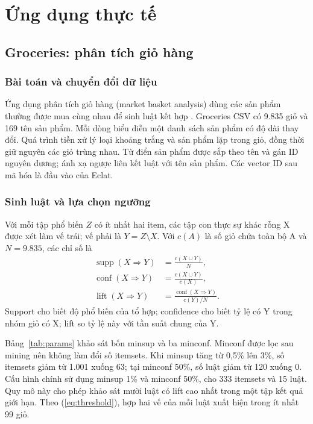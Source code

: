 \section{Ứng dụng thực tế}\label{sec:applications}
\subsection{Groceries: phân tích giỏ hàng}\label{sec:groceries}
\subsubsection{Bài toán và chuyển đổi dữ liệu}
Ứng dụng phân tích giỏ hàng (market basket analysis) dùng các sản phẩm
thường được mua cùng nhau để sinh luật kết hợp \cite{agrawal}.
Groceries CSV \cite{groceries} có 9.835 giỏ và 169 tên sản phẩm.
Mỗi dòng biểu diễn một danh sách sản phẩm có độ dài thay đổi. Quá trình
tiền xử lý loại khoảng trắng và sản phẩm lặp trong giỏ, đồng thời giữ
nguyên các giỏ trùng nhau. Từ điển sản phẩm được sắp theo tên và gán ID
nguyên dương; ánh xạ ngược liên kết luật với tên sản phẩm. Các vector
ID sau mã hóa là đầu vào của Eclat.

\subsubsection{Sinh luật và lựa chọn ngưỡng}
Với mỗi tập phổ biến $Z$ có ít nhất hai item, các tập con thực sự khác
rỗng X được xét làm vế trái; vế phải là $Y=Z\setminus X$.
Với $c(A)$ là số giỏ chứa toàn bộ A và $N=9.835$, các chỉ số là
\begin{align}
\operatorname{supp}(X\Rightarrow Y)&=\frac{c(X\cup Y)}{N},\\
\operatorname{conf}(X\Rightarrow Y)&=\frac{c(X\cup Y)}{c(X)},\\
\operatorname{lift}(X\Rightarrow Y)&=\frac{\operatorname{conf}(X\Rightarrow Y)}{c(Y)/N}.
\end{align}
Support cho biết độ phổ biến của tổ hợp; confidence cho biết tỷ lệ có Y
trong nhóm giỏ có X; lift so tỷ lệ này với tần suất chung của Y.

Bảng~\ref{tab:params} khảo sát bốn minsup và ba minconf. Minconf được lọc
sau mining nên không làm đổi số itemsets. Khi minsup tăng từ 0,5\% lên 3\%,
số itemsets giảm từ 1.001 xuống 63; tại minconf 50\%, số luật giảm từ 120
xuống 0. Cấu hình chính sử dụng minsup 1\% và minconf 50\%, cho 333
itemsets và 15 luật. Quy mô này cho phép khảo sát mười luật có lift cao
nhất trong một tập kết quả giới hạn. Theo (\ref{eq:threshold}), hợp hai
vế của mỗi luật xuất hiện trong ít nhất 99 giỏ.


